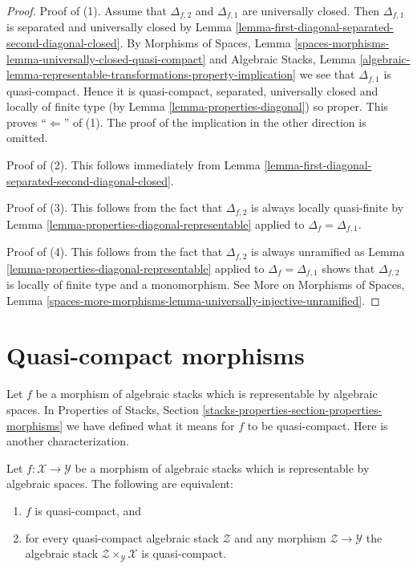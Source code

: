 \begin{proof}
Proof of (1). Assume that $\Delta_{f, 2}$ and $\Delta_{f, 1}$ are
universally closed. Then $\Delta_{f, 1}$ is separated and universally
closed by
Lemma \ref{lemma-first-diagonal-separated-second-diagonal-closed}.
By
Morphisms of Spaces,
Lemma \ref{spaces-morphisms-lemma-universally-closed-quasi-compact}
and
Algebraic Stacks,
Lemma \ref{algebraic-lemma-representable-transformations-property-implication}
we see that $\Delta_{f, 1}$ is quasi-compact.
Hence it is quasi-compact, separated, universally closed and locally of
finite type (by
Lemma \ref{lemma-properties-diagonal})
so proper. This proves ``$\Leftarrow$'' of (1).
The proof of the implication in the other direction is omitted.

\medskip\noindent
Proof of (2). This follows immediately from
Lemma \ref{lemma-first-diagonal-separated-second-diagonal-closed}.

\medskip\noindent
Proof of (3). This follows from the fact that $\Delta_{f, 2}$ is always locally
quasi-finite by
Lemma \ref{lemma-properties-diagonal-representable}
applied to $\Delta_f = \Delta_{f, 1}$.

\medskip\noindent
Proof of (4). This follows from the fact that $\Delta_{f, 2}$ is always
unramified as
Lemma \ref{lemma-properties-diagonal-representable}
applied to $\Delta_f = \Delta_{f, 1}$ shows that
$\Delta_{f, 2}$ is locally of finite type and a monomorphism.
See
More on Morphisms of Spaces,
Lemma \ref{spaces-more-morphisms-lemma-universally-injective-unramified}.
\end{proof}










\section{Quasi-compact morphisms}
\label{section-quasi-compact}

\noindent
Let $f$ be a morphism of algebraic stacks which is representable by
algebraic spaces. In
Properties of Stacks, Section
\ref{stacks-properties-section-properties-morphisms}
we have defined what it means for $f$ to be quasi-compact.
Here is another characterization.

\begin{lemma}
\label{lemma-characterize-representable-quasi-compact}
Let $f : \mathcal{X} \to \mathcal{Y}$ be a morphism of algebraic stacks
which is representable by algebraic spaces. The following are equivalent:
\begin{enumerate}
\item $f$ is quasi-compact, and
\item for every quasi-compact algebraic stack $\mathcal{Z}$
and any morphism $\mathcal{Z} \to \mathcal{Y}$ the algebraic stack
$\mathcal{Z} \times_\mathcal{Y} \mathcal{X}$ is quasi-compact.
\end{enumerate}
\end{lemma}

